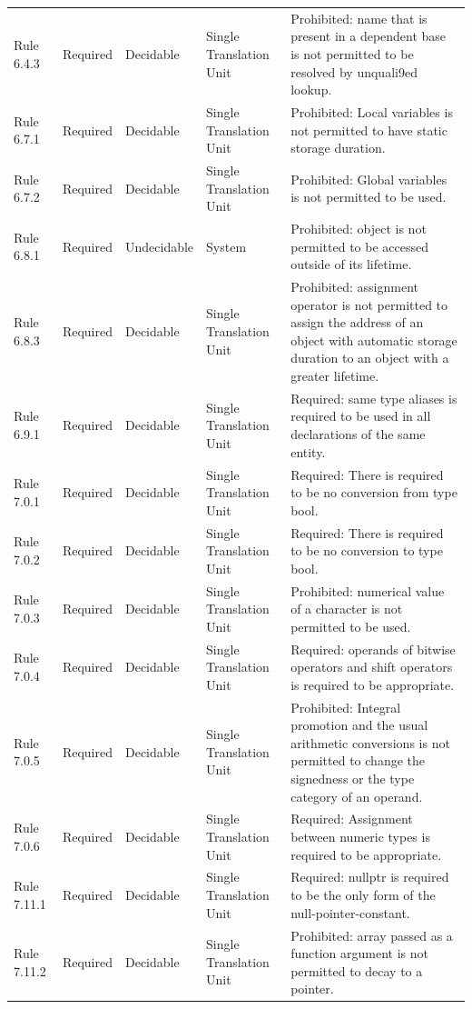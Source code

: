 \documentclass[11pt]{article}
\begin{document}
{\begin{longtable}{@{}P{2.2cm}P{1.7cm}P{2.1cm}P{3.0cm}P{6.7cm}@{}}
Rule 6.4.3 & Required & Decidable & Single Translation Unit & Prohibited: name that is present in a dependent base is not permitted to be resolved by unquali9ed lookup. \\
Rule 6.7.1 & Required & Decidable & Single Translation Unit & Prohibited: Local variables is not permitted to have static storage duration. \\
Rule 6.7.2 & Required & Decidable & Single Translation Unit & Prohibited: Global variables is not permitted to be used. \\
Rule 6.8.1 & Required & Undecidable & System & Prohibited: object is not permitted to be accessed outside of its lifetime. \\
Rule 6.8.3 & Required & Decidable & Single Translation Unit & Prohibited: assignment operator is not permitted to assign the address of an object with automatic storage duration to an object with a greater lifetime. \\
Rule 6.9.1 & Required & Decidable & Single Translation Unit & Required: same type aliases is required to be used in all declarations of the same entity. \\
Rule 7.0.1 & Required & Decidable & Single Translation Unit & Required: There is required to be no conversion from type bool. \\
Rule 7.0.2 & Required & Decidable & Single Translation Unit & Required: There is required to be no conversion to type bool. \\
Rule 7.0.3 & Required & Decidable & Single Translation Unit & Prohibited: numerical value of a character is not permitted to be used. \\
Rule 7.0.4 & Required & Decidable & Single Translation Unit & Required: operands of bitwise operators and shift operators is required to be appropriate. \\
Rule 7.0.5 & Required & Decidable & Single Translation Unit & Prohibited: Integral promotion and the usual arithmetic conversions is not permitted to change the signedness or the type category of an operand. \\
Rule 7.0.6 & Required & Decidable & Single Translation Unit & Required: Assignment between numeric types is required to be appropriate. \\
Rule 7.11.1 & Required & Decidable & Single Translation Unit & Required: nullptr is required to be the only form of the null-pointer-constant. \\
Rule 7.11.2 & Required & Decidable & Single Translation Unit & Prohibited: array passed as a function argument is not permitted to decay to a pointer. \\

\end{longtable}}
\end{document}
